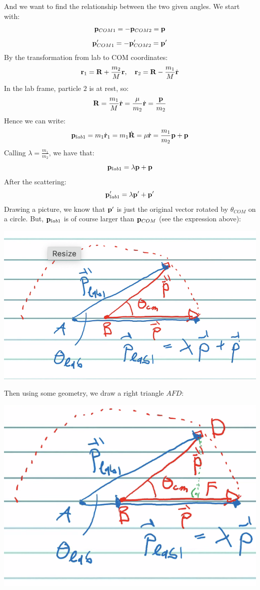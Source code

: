 \documentclass[../PHYS306Notes.tex]{subfiles}
\begin{document}
And we want to find the relationship between the two given angles. We start with:
\[\mathbf{p}_{COM1} = -\mathbf{p}_{COM2} = \mathbf{p}\]
\[\mathbf{p}'_{COM1} = -\mathbf{p}'_{COM2} = \mathbf{p}'\]
By the transformation from lab to COM coordinates:
\[\mathbf{r}_1 = \mathbf{R} + \frac{m_2}{M}\mathbf{r}, \quad \mathbf{r}_2 = \mathbf{R} - \frac{m_1}{M}\dot{\mathbf{r}}\]
In the lab frame, particle $2$ is at rest, so:
\[\mathbf{R} = \frac{m_1}{M}\dot{\mathbf{r}} = \frac{\mu}{m_2}\dot{\mathbf{r}} = \frac{\mathbf{p}}{m_2} \]
Hence we can write:
\[\mathbf{p}_{lab1} = m_1\dot{\mathbf{r}}_1 = m_1\dot{\mathbf{R}} = \mu\dot{\mathbf{r}} = \frac{m_1}{m_2}\mathbf{p} + \mathbf{p}\]
Calling $\lambda = \frac{m_1}{m_2}$, we have that:
\[\mathbf{p}_{lab1} = \lambda\mathbf{p} + \mathbf{p}\]
After the scattering:
\[\mathbf{p}'_{lab1} = \lambda\mathbf{p}' + \mathbf{p}'\]
Drawing a picture, we know that $\mathbf{p}'$ is just the original vector rotated by $\theta_{COM}$ on a circle. But, $\mathbf{p}_{lab1}$ is of course larger than $\mathbf{p}_{COM}$ (see the expression above):
\begin{center}
    \includegraphics[scale=0.5]{Lecture-29/l29-img4.png}
\end{center}
Then using some geometry, we draw a right triangle $AFD$:
\begin{center}
    \includegraphics[scale=0.5]{Lecture-29/l29-img5.png}
\end{center}
\end{document}
